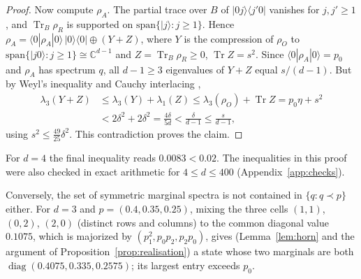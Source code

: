 \documentclass[11pt]{amsart}
\theoremstyle{definition}
\theoremstyle{remark}
\numberwithin{equation}{section}
\newcommand{\C}{\mathbb{C}}
\newcommand{\Tr}{\operatorname{Tr}}
\newcommand{\diag}{\operatorname{diag}}
\begin{document}
\begin{proof}
Now compute $\rho_A$. The partial trace over $B$ of $|0j\rangle\langle j'0|$ vanishes for $j,j'\ge1$, and
$\Tr_B\rho_R$ is supported on $\mathrm{span}\{|j\rangle:j\ge1\}$. Hence
$\rho_A=\langle0|\rho_A|0\rangle\,|0\rangle\langle0|\oplus(Y+Z)$, where $Y$ is the compression of $\rho_O$
to $\mathrm{span}\{|j0\rangle:j\ge1\}\cong\C^{d-1}$ and $Z=\Tr_B\rho_R\ge0$, $\Tr Z=s^2$. Since
$\langle0|\rho_A|0\rangle=p_0$ and $\rho_A$ has spectrum $q$, all $d-1\ge3$ eigenvalues of $Y+Z$ equal
$s/(d-1)$. But by Weyl's inequality and Cauchy interlacing \cite{Bhatia1997},
\begin{align*}
  \lambda_3(Y+Z)&\le\lambda_3(Y)+\lambda_1(Z)\le\lambda_3(\rho_O)+\Tr Z=p_0\eta+s^2\\
  &<2\delta^2+2\delta^2=\frac{4\delta}{5d}<\frac{\delta}{d-1}\le\frac s{d-1},
\end{align*}
using $s^2\le\frac{49}{25}\delta^2$. This contradiction proves the claim.
\end{proof}

For $d=4$ the final inequality reads $0.0083<0.02$. The inequalities in this proof were also checked in
exact arithmetic for $4\le d\le400$ (Appendix~\ref{app:checks}).

Conversely, the set of symmetric marginal spectra is not contained in $\{q:q\prec p\}$ either. For
$d=3$ and $p=(0.4,0.35,0.25)$, mixing the three cells $(1,1)$, $(0,2)$, $(2,0)$ (distinct rows and
columns) to the common diagonal value $0.1075$, which is majorized by $(p_1^2,p_0p_2,p_2p_0)$, gives
(Lemma~\ref{lem:horn} and the argument of Proposition~\ref{prop:realisation}) a state whose two marginals
are both $\diag(0.4075,0.335,0.2575)$; its largest entry exceeds $p_0$.
\end{document}

